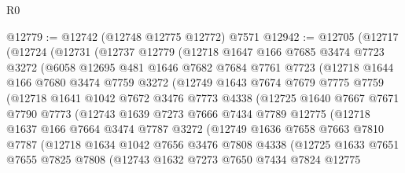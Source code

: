 \begin{lexlean}{R0}
\begin{coremodule}
@12779 := @12742 (@12748 @12775 @12772) @7571
@12942 := @12705
    (@12717
      (@12724
        (@12731
          (@12737
            @12779
            (@12718
              @1647
              @166
              @7685
              @3474
              @7723
              @3272
              (@6058
                @12695
                @481
                @1646
                @7682
                @7684
                @7761
                @7723
                (@12718
                  @1644
                  @166
                  @7680
                  @3474
                  @7759
                  @3272
                  (@12749
                    @1643
                    @7674
                    @7679
                    @7775
                    @7759
                    (@12718
                      @1641
                      @1042
                      @7672
                      @3476
                      @7773
                      @4338
                      (@12725
                        @1640
                        @7667
                        @7671
                        @7790
                        @7773
                        (@12743
                          @1639
                          @7273
                          @7666
                          @7434
                          @7789
                          @12775
                          (@12718
                            @1637
                            @166
                            @7664
                            @3474
                            @7787
                            @3272
                            (@12749
                              @1636
                              @7658
                              @7663
                              @7810
                              @7787
                              (@12718
                                @1634
                                @1042
                                @7656
                                @3476
                                @7808
                                @4338
                                (@12725
                                  @1633
                                  @7651
                                  @7655
                                  @7825
                                  @7808
                                  (@12743
                                    @1632
                                    @7273
                                    @7650
                                    @7434
                                    @7824
                                    @12775

\end{coremodule}
\end{lexlean}
